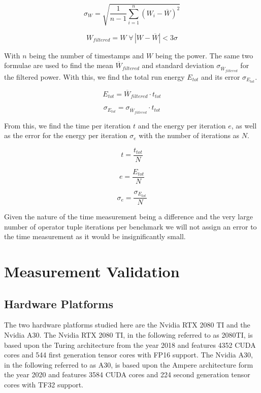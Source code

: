 \documentclass[conference]{IEEEtran}
\begin{document}
\begin{equation}
\sigma_W = \sqrt{\frac{1}{n - 1} \sum_{i=1}^{n} (W_i - \overline{W})^2}
\end{equation}

\begin{equation}
W_{filtered} = W \; \forall \, |W - \overline{W}| < 3 \sigma
\end{equation}

With \( n \) being the number of timestamps and \( W \) being the power. The same two formulae are used to find the mean \( \overline{W}_{filtered} \) and standard deviation \( \sigma_{\overline{W}_{filtered}} \) for the filtered power. With this, we find the total run energy \( E_{tot} \) and its error \( \sigma_{E_{tot}} \).

\begin{equation}
E_{tot} = \overline{W}_{filtered} \cdot t_{tot}
\end{equation}

\begin{equation}
\sigma_{E_{tot}} = \sigma_{\overline{W}_{filtered}} \cdot t_{tot}
\end{equation}

From this, we find the time per iteration \( t \) and the energy per iteration \( e \), as well as the error for the energy per iteration \( \sigma_e \) with the number of iterations as \( N \).

\begin{equation}
t = \frac{t_{tot}}{N}
\end{equation}

\begin{equation}
e = \frac{E_{tot}}{N}
\end{equation}

\begin{equation}
\sigma_e = \frac{\sigma_{E_{tot}}}{N}
\end{equation}

Given the nature of the time measurement being a difference and the very large number of operator tuple iterations per benchmark we will not assign an error to the time measurement as it would be insignificantly small.

\section{Measurement Validation}


\subsection{Hardware Platforms}
The two hardware platforms studied here are the Nvidia RTX 2080 TI and the Nvidia A30. The Nvidia RTX 2080 TI, in the following referred to as 2080TI, is based upon the Turing architecture from the year 2018 and features 4352 CUDA cores and 544 first generation tensor cores with FP16 support. The Nvidia A30, in the following referred to as A30, is based upon the Ampere architecture form the year 2020 and features 3584 CUDA cores and 224 second generation tensor cores with TF32 support.\\
\end{document}
